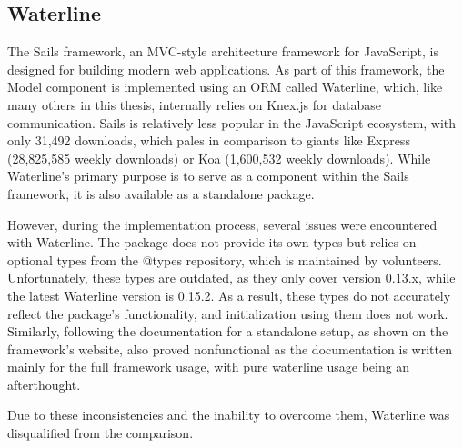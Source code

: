 \subsection{Waterline}

The Sails framework, an MVC-style architecture framework for JavaScript, is
designed for building modern web applications. As part of this framework, the
Model component is implemented using an ORM called Waterline, which, like many
others in this thesis, internally relies on Knex.js for database communication.
Sails is relatively less popular in the JavaScript ecosystem, with only 31,492
downloads, which pales in comparison to giants like Express (28,825,585 weekly
downloads) or Koa (1,600,532 weekly downloads). While Waterline's primary
purpose is to serve as a component within the Sails framework, it is also
available as a standalone package.

However, during the implementation process, several issues were encountered with
Waterline. The package does not provide its own types but relies on optional
types from the @types repository, which is maintained by volunteers.
Unfortunately, these types are outdated, as they only cover version 0.13.x,
while the latest Waterline version is 0.15.2. As a result, these types do not
accurately reflect the package's functionality, and initialization using them
does not work. Similarly, following the documentation for a standalone setup, as
shown on the framework's website, also proved nonfunctional as the documentation
is written mainly for the full framework usage, with pure waterline usage being
an afterthought.

Due to these inconsistencies and the inability to overcome them, Waterline was
disqualified from the comparison.
